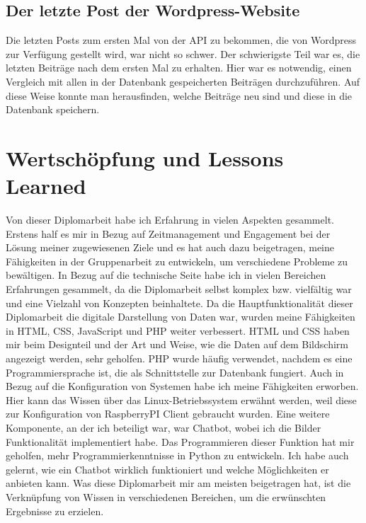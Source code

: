 \subsection{Der letzte Post der Wordpress-Website}

Die letzten Posts zum ersten Mal von der API zu bekommen, die von Wordpress zur Verfügung gestellt wird, war nicht so schwer. Der schwierigste Teil war es, die letzten Beiträge nach dem ersten Mal zu erhalten. Hier war es notwendig, einen Vergleich mit allen in der Datenbank gespeicherten Beiträgen durchzuführen. Auf diese Weise konnte man herausfinden, welche Beiträge neu sind und diese in die Datenbank speichern.


\section{Wertschöpfung und Lessons Learned}


Von dieser Diplomarbeit habe ich Erfahrung in vielen Aspekten gesammelt. Erstens half es mir in Bezug auf Zeitmanagement und Engagement bei der Lösung meiner zugewiesenen Ziele und es hat auch dazu beigetragen, meine Fähigkeiten in der Gruppenarbeit zu entwickeln, um verschiedene Probleme zu bewältigen. In Bezug auf die technische Seite habe ich in vielen Bereichen Erfahrungen gesammelt, da die Diplomarbeit selbst komplex bzw. vielfältig war und eine Vielzahl von Konzepten beinhaltete. Da die Hauptfunktionalität dieser Diplomarbeit die digitale Darstellung von Daten war, wurden meine Fähigkeiten in HTML, CSS, JavaScript und PHP weiter verbessert. HTML und CSS haben mir beim Designteil und der Art und Weise, wie die Daten auf dem Bildschirm angezeigt werden, sehr geholfen. PHP wurde häufig verwendet, nachdem es eine Programmiersprache ist, die als Schnittstelle zur Datenbank fungiert. Auch in Bezug auf die Konfiguration von Systemen habe ich meine Fähigkeiten erworben. Hier kann das Wissen über das Linux-Betriebssystem erwähnt werden, weil diese zur Konfiguration von RaspberryPI Client gebraucht wurden. Eine weitere Komponente, an der ich beteiligt war, war Chatbot, wobei ich die Bilder Funktionalität implementiert habe. Das Programmieren dieser Funktion hat mir geholfen, mehr Programmierkenntnisse in Python zu entwickeln. Ich habe auch gelernt, wie ein Chatbot wirklich funktioniert und welche Möglichkeiten er anbieten kann. Was diese Diplomarbeit mir am meisten beigetragen hat, ist die Verknüpfung von Wissen in verschiedenen Bereichen, um die erwünschten Ergebnisse zu erzielen.

